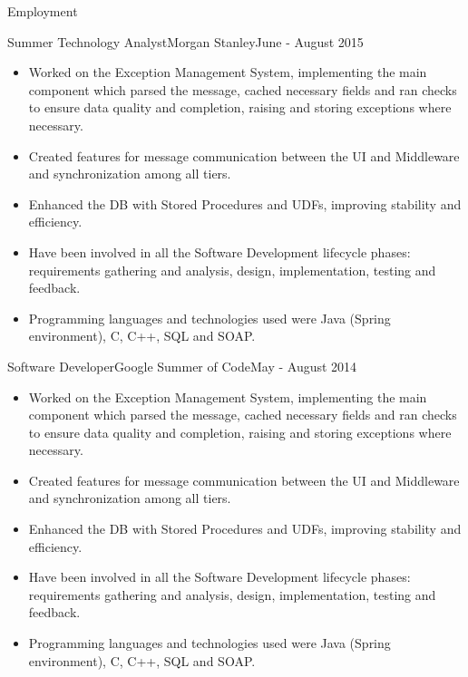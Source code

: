 \documentclass[]{cv}
\begin{document}
\begin{cvsection}{Employment}
		\begin{cvsubsection}{Summer Technology Analyst}{Morgan Stanley}{June - August 2015}
			\begin{itemize}
				\item Worked on the Exception Management System, implementing the main component which parsed the message, cached necessary fields and ran checks to ensure 
					data quality and completion, raising and storing exceptions where necessary.
				\item Created features for message communication between the UI and Middleware and synchronization among all tiers.	
				\item Enhanced the DB with Stored Procedures and UDFs, improving stability and efficiency.
				\item Have been involved in all the Software Development lifecycle phases: requirements gathering and analysis, design,
					implementation, testing and feedback.
				\item Programming languages and technologies used were Java (Spring environment), C, C++, SQL and SOAP.
			\end{itemize}
		\end{cvsubsection}

		\begin{cvsubsection}{Software Developer}{Google Summer of Code}{May - August 2014}
			\begin{itemize}
				\item Worked on the Exception Management System, implementing the main component which parsed the message, cached necessary fields and ran checks to ensure 
					data quality and completion, raising and storing exceptions where necessary.
				\item Created features for message communication between the UI and Middleware and synchronization among all tiers.	
				\item Enhanced the DB with Stored Procedures and UDFs, improving stability and efficiency.
				\item Have been involved in all the Software Development lifecycle phases: requirements gathering and analysis, design,
					implementation, testing and feedback.
				\item Programming languages and technologies used were Java (Spring environment), C, C++, SQL and SOAP.
			\end{itemize}
		\end{cvsubsection}


\end{cvsection}
\end{document}
